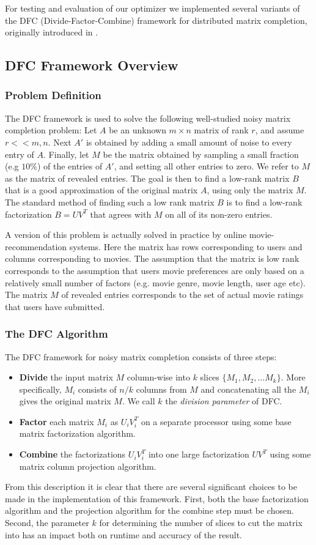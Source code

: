 For testing and evaluation of our optimizer we implemented several variants of the DFC (Divide-Factor-Combine) framework for distributed matrix completion, originally introduced in \cite{Ameet}.

\subsection{DFC Framework Overview}
\subsubsection{Problem Definition}
The DFC framework is used to solve the following well-studied noisy matrix completion problem: Let $A$ be an unknown $m\times n$ matrix of rank $r$, and assume $r<<m,n$. Next $A'$ is obtained by adding a small amount of noise to every entry of $A$. Finally, let $M$ be the matrix obtained by sampling a small fraction (e.g $10\%$) of the entries of $A'$, and setting all other entries to zero. We refer to $M$ as the matrix of revealed entries. The goal is then to find a low-rank matrix $B$ that is a good approximation of the original matrix $A$, using only the matrix $M$. The standard method of finding such a low rank matrix $B$ is to find a low-rank factorization $B=UV^T$ that agrees with $M$ on all of its non-zero entries.

A version of this problem is actually solved in practice by online movie-recommendation systems. Here the matrix has rows corresponding to users and columns corresponding to movies. The assumption that the matrix is low rank corresponds to the assumption that users movie preferences are only based on a relatively small number of factors (e.g. movie genre, movie length, user age etc). The matrix $M$ of revealed entries corresponds to the set of actual movie ratings that users have submitted.

\subsubsection{The DFC Algorithm}
The DFC framework for noisy matrix completion consists of three steps:
\begin{itemize}
\item \textbf{Divide} the input matrix $M$ column-wise into $k$ slices $\{M_1,M_2,...M_k\}$. More specifically, $M_i$ consists of $n/k$ columns from $M$ and concatenating all the $M_i$ gives the original matrix $M$. We call $k$ the \emph{division parameter} of DFC.
\item \textbf{Factor} each matrix $M_i$ as $U_i V_i^T$ on a separate processor using some base matrix factorization algorithm.
\item \textbf{Combine} the factorizations $U_iV_i^T$ into one large factorization $UV^T$ using some matrix column projection algorithm.
\end{itemize}
From this description it is clear that there are several significant choices to be made in the implementation of this framework. First, both the base factorization algorithm and the projection algorithm for the combine step must be chosen. Second, the parameter $k$ for determining the number of slices to cut the matrix into has an impact both on runtime and accuracy of the result.

